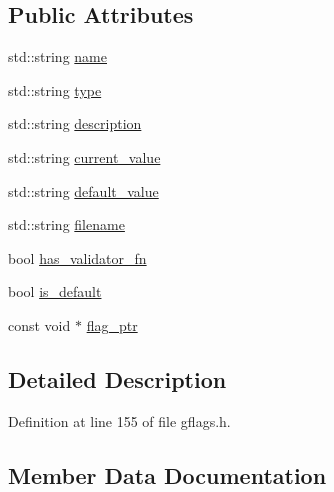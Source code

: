 \subsection*{Public Attributes}
\begin{DoxyCompactItemize}
\item 
std\+::string \hyperlink{structGFLAGS__NAMESPACE_1_1CommandLineFlagInfo_af56a81d2c7aca29203746976004abfc2}{name}
\item 
std\+::string \hyperlink{structGFLAGS__NAMESPACE_1_1CommandLineFlagInfo_a04f02cad9caae94a7ffd88e9cb89585b}{type}
\item 
std\+::string \hyperlink{structGFLAGS__NAMESPACE_1_1CommandLineFlagInfo_ae8bdcd07b1cb5b0561e122af6955fc90}{description}
\item 
std\+::string \hyperlink{structGFLAGS__NAMESPACE_1_1CommandLineFlagInfo_a654abe3f7f744c9b3772c78bb8a4e90e}{current\+\_\+value}
\item 
std\+::string \hyperlink{structGFLAGS__NAMESPACE_1_1CommandLineFlagInfo_a6f786f24cd6eaba82158e785809f53de}{default\+\_\+value}
\item 
std\+::string \hyperlink{structGFLAGS__NAMESPACE_1_1CommandLineFlagInfo_af889e5db7ce96fd27b34bd9cc6bfaa8c}{filename}
\item 
bool \hyperlink{structGFLAGS__NAMESPACE_1_1CommandLineFlagInfo_a0942bc076c1307b2ab7f3c6d6c7ae4c3}{has\+\_\+validator\+\_\+fn}
\item 
bool \hyperlink{structGFLAGS__NAMESPACE_1_1CommandLineFlagInfo_a9c9ae9de1ba9e9b591c21a761f9f08c2}{is\+\_\+default}
\item 
const void $\ast$ \hyperlink{structGFLAGS__NAMESPACE_1_1CommandLineFlagInfo_afe83fd3e23c58a6c03197807000e6990}{flag\+\_\+ptr}
\end{DoxyCompactItemize}


\subsection{Detailed Description}


Definition at line 155 of file gflags.\+h.



\subsection{Member Data Documentation}
